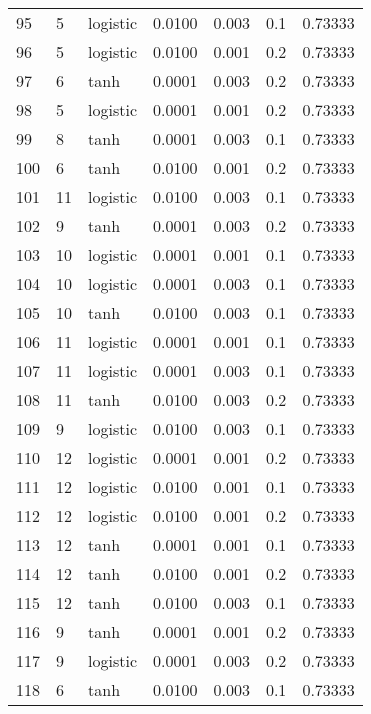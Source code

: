 \begin{tabular}{lllrrrr}
95  &           5 &  logistic &  0.0100 &  0.003 &  0.1 &   0.73333 \\
96  &           5 &  logistic &  0.0100 &  0.001 &  0.2 &   0.73333 \\
97  &           6 &      tanh &  0.0001 &  0.003 &  0.2 &   0.73333 \\
98  &           5 &  logistic &  0.0001 &  0.001 &  0.2 &   0.73333 \\
99  &           8 &      tanh &  0.0001 &  0.003 &  0.1 &   0.73333 \\
100 &           6 &      tanh &  0.0100 &  0.001 &  0.2 &   0.73333 \\
101 &          11 &  logistic &  0.0100 &  0.003 &  0.1 &   0.73333 \\
102 &           9 &      tanh &  0.0001 &  0.003 &  0.2 &   0.73333 \\
103 &          10 &  logistic &  0.0001 &  0.001 &  0.1 &   0.73333 \\
104 &          10 &  logistic &  0.0001 &  0.003 &  0.1 &   0.73333 \\
105 &          10 &      tanh &  0.0100 &  0.003 &  0.1 &   0.73333 \\
106 &          11 &  logistic &  0.0001 &  0.001 &  0.1 &   0.73333 \\
107 &          11 &  logistic &  0.0001 &  0.003 &  0.1 &   0.73333 \\
108 &          11 &      tanh &  0.0100 &  0.003 &  0.2 &   0.73333 \\
109 &           9 &  logistic &  0.0100 &  0.003 &  0.1 &   0.73333 \\
110 &          12 &  logistic &  0.0001 &  0.001 &  0.2 &   0.73333 \\
111 &          12 &  logistic &  0.0100 &  0.001 &  0.1 &   0.73333 \\
112 &          12 &  logistic &  0.0100 &  0.001 &  0.2 &   0.73333 \\
113 &          12 &      tanh &  0.0001 &  0.001 &  0.1 &   0.73333 \\
114 &          12 &      tanh &  0.0100 &  0.001 &  0.2 &   0.73333 \\
115 &          12 &      tanh &  0.0100 &  0.003 &  0.1 &   0.73333 \\
116 &           9 &      tanh &  0.0001 &  0.001 &  0.2 &   0.73333 \\
117 &           9 &  logistic &  0.0001 &  0.003 &  0.2 &   0.73333 \\
118 &           6 &      tanh &  0.0100 &  0.003 &  0.1 &   0.73333 \\

\end{tabular}
